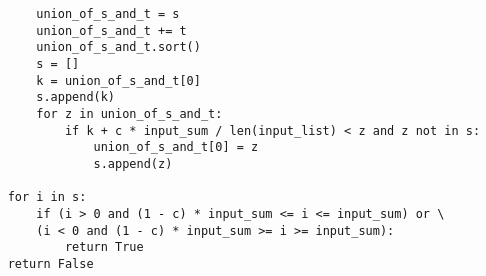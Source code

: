 \documentclass{article}
\begin{document}
\begin{enumerate}
\begin{landscape}
\begin{lstlisting}
        union_of_s_and_t = s
        union_of_s_and_t += t
        union_of_s_and_t.sort()
        s = []
        k = union_of_s_and_t[0]
        s.append(k)
        for z in union_of_s_and_t:
            if k + c * input_sum / len(input_list) < z and z not in s:
                union_of_s_and_t[0] = z
                s.append(z)

    for i in s:
        if (i > 0 and (1 - c) * input_sum <= i <= input_sum) or \
        (i < 0 and (1 - c) * input_sum >= i >= input_sum):
            return True
    return False
	\end{lstlisting}
	\end{landscape}
\end{enumerate}
\end{document}
